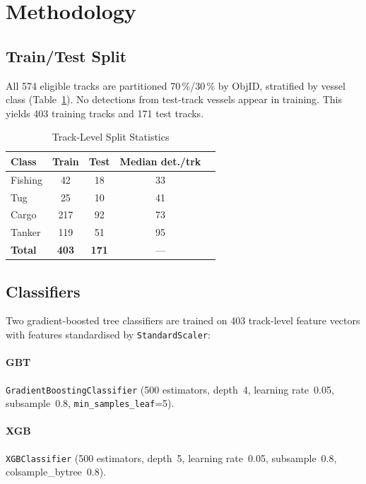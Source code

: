 \documentclass[10pt,journal,compsoc]{IEEEtran}
\begin{document}
\section{Methodology}\label{sec:method}

\subsection{Train/Test Split}

All 574 eligible tracks are partitioned 70\,\%/30\,\% by ObjID, stratified
by vessel class (Table~\ref{tab:split}).  No detections from test-track vessels
appear in training.  This yields 403 training tracks and 171 test tracks.

\begin{table}[!t]
\centering\small
\caption{Track-Level Split Statistics}
\label{tab:split}
\begin{tabular}{lcccc}
\toprule
Class & Train & Test & Median det./trk \\
\midrule
Fishing & 42 & 18 & 33 \\
Tug     & 25 & 10  & 41  \\
Cargo   & 217 & 92 & 73 \\
Tanker  & 119 & 51 & 95 \\
\midrule
\textbf{Total} & \textbf{403} & \textbf{171} & --- \\
\bottomrule
\end{tabular}
\end{table}

\subsection{Classifiers}

Two gradient-boosted tree classifiers are trained on 403 track-level feature
vectors with features standardised by \texttt{StandardScaler}:

\paragraph{GBT} \texttt{GradientBoostingClassifier} (500 estimators,
depth~4, learning rate~0.05, subsample~0.8, \texttt{min\_samples\_leaf}=5).

\paragraph{XGB} \texttt{XGBClassifier} (500 estimators, depth~5,
learning rate~0.05, subsample~0.8, colsample\_bytree~0.8).
\end{document}
